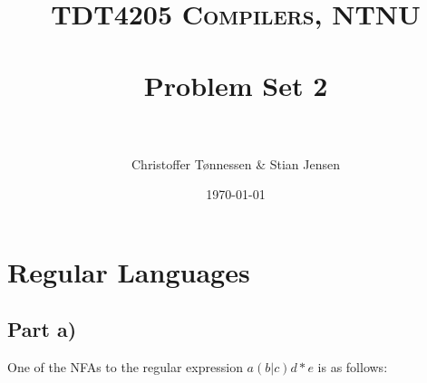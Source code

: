 \documentclass[paper=a4, fontsize=11pt]{scrartcl} %
\title{ 
\normalfont \normalsize 
\textsc{TDT4205 Compilers, NTNU} \\ [25pt] %
\horrule{0.5pt} \\[0.4cm] %
\huge Problem Set 2 \\ %
\horrule{2pt} \\[0.5cm] %
}
\author{Christoffer Tønnessen \& Stian Jensen} %
\date{\normalsize\today} %
\numberwithin{equation}{section} %
\numberwithin{figure}{section} %
\numberwithin{table}{section} %
\begin{document}
\maketitle %


\section{Regular Languages}

\subsection{Part a)}
One of the NFAs to the regular expression $a(b|c)d*e$ is as follows:
\end{document}
